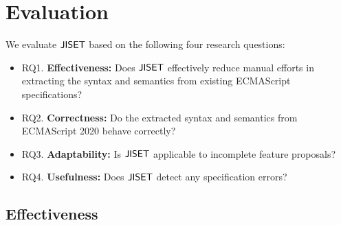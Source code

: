 \section{Evaluation}\label{sec:eval}

We evaluate \( \text{\sf JISET} \) based on the following four research questions:
\begin{itemize}[leftmargin=0.5cm]
\item RQ1. \textbf{Effectiveness:} Does \( \text{\sf JISET} \) effectively reduce
manual efforts in extracting the syntax and semantics from existing
ECMAScript specifications? 
\item RQ2. \textbf{Correctness:} Do the extracted syntax and semantics
from ECMAScript 2020 behave correctly?
\item RQ3. \textbf{Adaptability:} Is \( \text{\sf JISET} \) applicable to
incomplete feature proposals?
\item RQ4. \textbf{Usefulness:} Does \( \text{\sf JISET} \) detect any
specification errors?
\end{itemize}

\subsection{Effectiveness}


